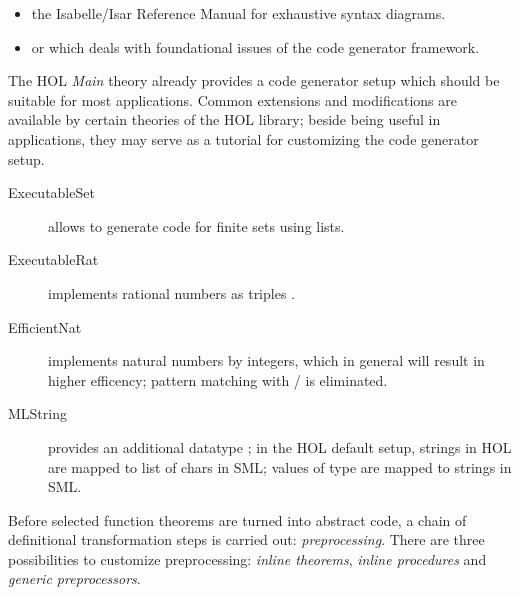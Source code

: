 \begin{isabellebody}
\begin{isamarkuptext}
  \begin{itemize}

  \item the Isabelle/Isar Reference Manual \cite{isabelle-isar-ref}
    for exhaustive syntax diagrams.
  \item or  which deals with foundational issues
    of the code generator framework.

  \end{itemize}%
\end{isamarkuptext}%
\isamarkuptrue%
%
\isamarkuptrue%
%
\begin{isamarkuptext}%
The HOL \emph{Main} theory already provides a code generator setup
  which should be suitable for most applications. Common extensions
  and modifications are available by certain theories of the HOL
  library; beside being useful in applications, they may serve
  as a tutorial for customizing the code generator setup.

  \begin{description}

    \item[ExecutableSet] allows to generate code
       for finite sets using lists.
    \item[ExecutableRat] implements rational
       numbers as triples .
    \item[EfficientNat] implements natural numbers by integers,
       which in general will result in higher efficency; pattern
       matching with  / 
       is eliminated. \label{eff_nat}
    \item[MLString] provides an additional datatype ;
       in the HOL default setup, strings in HOL are mapped to list
       of chars in SML; values of type  are
       mapped to strings in SML.

  \end{description}%
\end{isamarkuptext}%
\isamarkuptrue%
%
\isamarkuptrue%
%
\begin{isamarkuptext}%
Before selected function theorems are turned into abstract
  code, a chain of definitional transformation steps is carried
  out: \emph{preprocessing}. There are three possibilities
  to customize preprocessing: \emph{inline theorems},
  \emph{inline procedures} and \emph{generic preprocessors}.


\end{isamarkuptext}
\end{isabellebody}
